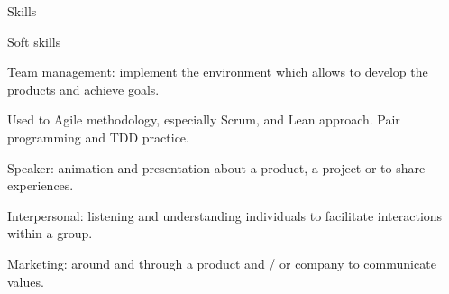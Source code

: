 \begin{rSection}{Skills}
  \begin{rSubsection}{Soft skills}{}{}{}
    \item Team management: implement the environment which allows to develop the products and achieve goals.
    \item Used to Agile methodology, especially Scrum, and Lean approach. Pair programming and TDD practice.
    \item Speaker: animation and presentation about a product, a project or to share experiences.
    \item Interpersonal: listening and understanding individuals to facilitate interactions within a group.
    \item Marketing: around and through a product and / or company to communicate values.
  \end{rSubsection}

\end{rSection}

